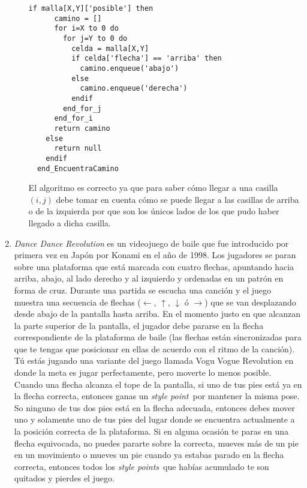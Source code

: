 \documentclass[11pt,letterpaper]{article}
\begin{document}
\begin{enumerate}[leftmargin=*]
\begin{enumerate}[label=\roman*)]
\begin{lstlisting}[caption=Encontrar camino en matríz de $X\times Y$]
    if malla[X,Y]['posible'] then
      camino = []
      for i=X to 0 do
        for j=Y to 0 do
          celda = malla[X,Y]
          if celda['flecha'] == 'arriba' then
            camino.enqueue('abajo')
          else
            camino.enqueue('derecha')
          endif
        end_for_j
      end_for_i
      return camino
    else
      return null
    endif
  end_EncuentraCamino
      \end{lstlisting}
      
      El algoritmo es correcto ya que para saber cómo llegar a una casilla $(i,j)$ debe tomar en cuenta cómo se puede llegar a las casillas de arriba o de la izquierda por que son los únicos lados de los que pudo haber llegado a dicha casilla.
    \end{enumerate}
    
    \newcommand\stylePoint{\textit{style point}}
    \newcommand\stylePoints{\textit{style points}}
    \item \textit{Dance Dance Revolution} es un videojuego de baile que fue introducido por primera vez en Japón por Konami en el año de 1998. Los jugadores se paran sobre una plataforma que está marcada con cuatro flechas, apuntando hacia arriba, abajo, al lado derecho y al izquierdo y ordenadas en un patrón en forma de cruz. Durante una partida se escucha una canción y el juego muestra una secuencia de flechas ($\leftarrow$, $\uparrow$, $\downarrow$ ó $\rightarrow$) que se van desplazando desde abajo de la pantalla hasta arriba. En el momento justo en que alcanzan la parte superior de la pantalla, el jugador debe pararse en la flecha correspondiente de la plataforma de baile (las flechas están sincronizadas para que te tengas que posicionar en ellas de acuerdo con el ritmo de la canción). Tú estás jugando una variante del juego llamada Vogu Vogue Revolution en donde la meta es jugar perfectamente, pero moverte lo menos posible. Cuando una flecha alcanza el tope de la pantalla, si uno de tus pies está ya en la flecha correcta, entonces ganas un \stylePoint\ por mantener la misma pose. So ninguno de tus dos pies está en la flecha adecuada, entonces debes mover uno y solamente uno de tus pies del lugar donde se encuentra actualmente a la posición correcta de la plataforma. Si en alguna ocasión te paras en una flecha equivocada, no puedes pararte sobre la correcta, mueves más de un pie en un movimiento o mueves un pie cuando ya estabas parado en la flecha correcta, entonces todos los \stylePoints\ que habías acumulado te son quitados y pierdes el juego.
    

\end{enumerate}
\end{document}
